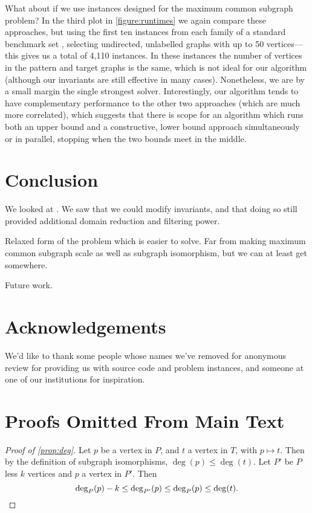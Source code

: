 \documentclass[letterpaper]{article}
\newcommand{\citep}[1]{\cite{#1}}
\theoremstyle{definition}
\begin{document}
What about if we use instances designed for the maximum common subgraph problem? In the third plot
in \cref{figure:runtimes} we again compare these approaches, but using the first ten instances from
each family of a standard benchmark set
\citep{DBLP:journals/prl/SantoFSV03,DBLP:journals/jgaa/ConteFV07}, selecting undirected, unlabelled
graphs with up to 50 vertices---this gives us a total of 4,110 instances. In these instances the
number of vertices in the pattern and target graphs is the same, which is not ideal for our
algorithm (although our invariants are still effective in many cases). Nonetheless, we are by a
small margin the single strongest solver. Interestingly, our algorithm tends to have complementary
performance to the other two approaches (which are much more correlated), which suggests that there
is scope for an algorithm which runs both an upper bound and a constructive, lower bound approach
simultaneously or in parallel, stopping when the two bounds meet in the middle.

\section{Conclusion}

We looked at . We saw that we could modify invariants, and that doing so still provided additional
domain reduction and filtering power.

Relaxed form of the problem which is easier to solve. Far from making maximum common subgraph scale
as well as subgraph isomorphism, but we can at least get somewhere.

Future work.

\section*{Acknowledgements}

We'd like to thank some people whose names we've removed for anonymous review for providing us with
source code and problem instances, and someone at one of our institutions for inspiration.




\clearpage
\appendix

\section{Proofs Omitted From Main Text}

\begin{proof}[Proof of \cref{prop:deg}]
Let $p$ be a vertex in $P$, and $t$ a vertex in $T$, with $p\mapsto t$. Then by the definition of subgraph isomorphisms, $\deg(p) \le \deg(t)$. Let $P'$ be $P$ less $k$ vertices and $p$ a vertex in $P'$. Then
\[
\deg_{P}(p)-k \le \deg_{P'}(p) \le \deg_{P}(p) \le \deg(t). \qedhere
\]
\end{proof}
\end{document}

